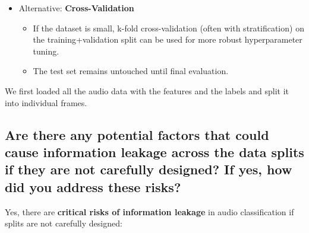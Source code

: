 \begin{itemize}
	\item Alternative: {\bf Cross-Validation}
	\begin{itemize}
		\item If the dataset is small, k-fold cross-validation (often with stratification) on the training+validation split can be used for more robust hyperparameter tuning.
		\item The test set remains untouched until final evaluation.
	\end{itemize}
\end{itemize}


We first loaded all the audio data with the features and the labels and split it into individual frames. 




\subsection{Are there any potential factors that could cause information leakage across the data splits if they are not carefully designed? If yes, how did you address these risks?}
Yes, there are {\bf critical risks of information leakage} in audio classification if splits are not carefully designed:


\label{sec:Data Split:b}

